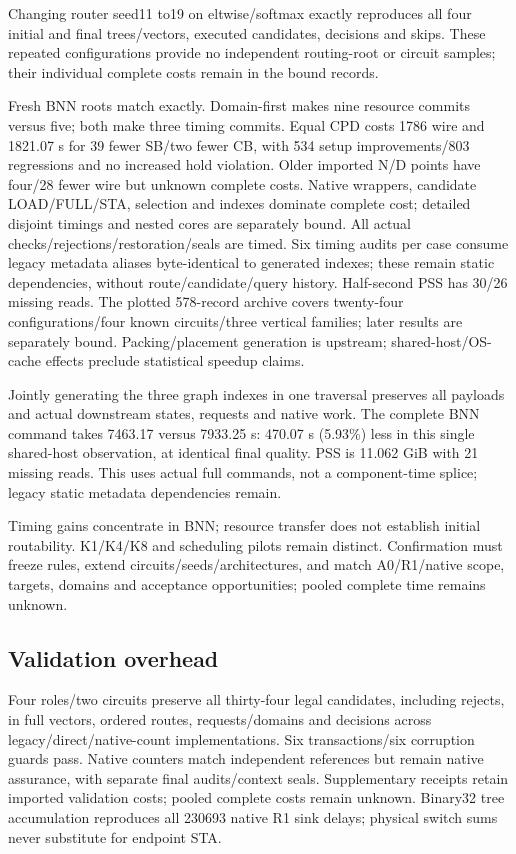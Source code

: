 \documentclass[conference,10pt]{IEEEtran}
\begin{document}
Changing router seed11 to19 on eltwise/softmax exactly reproduces all four initial and final trees/vectors, executed candidates, decisions and skips. These repeated configurations provide no independent routing-root or circuit samples; their individual complete costs remain in the bound records.

Fresh BNN roots match exactly. Domain-first makes nine resource commits versus five; both make three timing commits. Equal CPD costs 1786 wire and 1821.07 s for 39 fewer SB/two fewer CB, with 534 setup improvements/803 regressions and no increased hold violation. Older imported N/D points have four/28 fewer wire but unknown complete costs. Native wrappers, candidate LOAD/FULL/STA, selection and indexes dominate complete cost; detailed disjoint timings and nested cores are separately bound. All actual checks/rejections/restoration/seals are timed. Six timing audits per case consume legacy metadata aliases byte-identical to generated indexes; these remain static dependencies, without route/candidate/query history. Half-second PSS has 30/26 missing reads. The plotted 578-record archive covers twenty-four configurations/four known circuits/three vertical families; later results are separately bound. Packing/placement generation is upstream; shared-host/OS-cache effects preclude statistical speedup claims.

Jointly generating the three graph indexes in one traversal preserves all payloads and actual downstream states, requests and native work. The complete BNN command takes 7463.17 versus 7933.25 s: 470.07 s (5.93\%) less in this single shared-host observation, at identical final quality. PSS is 11.062 GiB with 21 missing reads. This uses actual full commands, not a component-time splice; legacy static metadata dependencies remain.

Timing gains concentrate in BNN; resource transfer does not establish initial routability. K1/K4/K8 and scheduling pilots remain distinct. Confirmation must freeze rules, extend circuits/seeds/architectures, and match A0/R1/native scope, targets, domains and acceptance opportunities; pooled complete time remains unknown.

\subsection{Validation overhead}
Four roles/two circuits preserve all thirty-four legal candidates, including rejects, in full vectors, ordered routes, requests/domains and decisions across legacy/direct/native-count implementations. Six transactions/six corruption guards pass. Native counters match independent references but remain native assurance, with separate final audits/context seals. Supplementary receipts retain imported validation costs; pooled complete costs remain unknown. Binary32 tree accumulation reproduces all 230693 native R1 sink delays; physical switch sums never substitute for endpoint STA.
\end{document}
